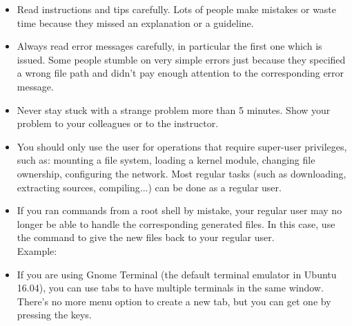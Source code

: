 \begin{itemize}

\item Read instructions and tips carefully. Lots of people make
  mistakes or waste time because they missed an explanation or a
  guideline.

\item Always read error messages carefully, in particular the first
  one which is issued. Some people stumble on very simple errors just
  because they specified a wrong file path and didn't pay enough
  attention to the corresponding error message.

\item Never stay stuck with a strange problem more than 5
  minutes. Show your problem to your colleagues or to the instructor.

\item You should only use the  user for operations that require
  super-user privileges, such as: mounting a file system, loading a
  kernel module, changing file ownership, configuring the
  network. Most regular tasks (such as downloading, extracting
  sources, compiling...) can be done as a regular user.

\item If you ran commands from a root shell by mistake, your regular
  user may no longer be able to handle the corresponding generated
  files. In this case, use the  command to give the new
  files back to your regular user.\\
  Example: 

\item If you are using Gnome Terminal (the default terminal emulator
  in Ubuntu 16.04), you can use tabs to have multiple terminals
  in the same window. There's no more menu option to create a new
  tab, but you can get one by pressing the \code{[Ctrl] [Shift] [t]}
  keys.

\end{itemize}

